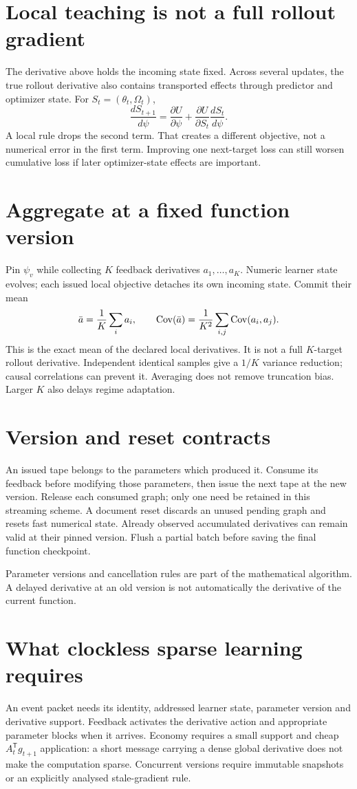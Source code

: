 \documentclass[11pt]{article}
\begin{document}
\section{Local teaching is not a full rollout gradient}
The derivative above holds the incoming state fixed. Across several updates, the true rollout derivative also contains transported effects through predictor and optimizer state. For $S_t=(\theta_t,\Omega_t)$,
\[
 \frac{dS_{t+1}}{d\psi}=\frac{\partial U}{\partial\psi}
       +\frac{\partial U}{\partial S_t}\frac{dS_t}{d\psi}.
\]
A local rule drops the second term. That creates a different objective, not a numerical error in the first term. Improving one next-target loss can still worsen cumulative loss if later optimizer-state effects are important.
\section{Aggregate at a fixed function version}
Pin $\psi_v$ while collecting $K$ feedback derivatives $a_1,\ldots,a_K$. Numeric learner state evolves; each issued local objective detaches its own incoming state. Commit their mean
\[
 \bar a=\frac1K\sum_i a_i,\qquad
 \operatorname{Cov}(\bar a)=\frac1{K^2}\sum_{i,j}\operatorname{Cov}(a_i,a_j).
\]
This is the exact mean of the declared local derivatives. It is not a full $K$-target rollout derivative. Independent identical samples give a $1/K$ variance reduction; causal correlations can prevent it. Averaging does not remove truncation bias. Larger $K$ also delays regime adaptation.
\section{Version and reset contracts}
An issued tape belongs to the parameters which produced it. Consume its feedback before modifying those parameters, then issue the next tape at the new version. Release each consumed graph; only one need be retained in this streaming scheme. A document reset discards an unused pending graph and resets fast numerical state. Already observed accumulated derivatives can remain valid at their pinned version. Flush a partial batch before saving the final function checkpoint.
\begin{keyidea}
Parameter versions and cancellation rules are part of the mathematical algorithm. A delayed derivative at an old version is not automatically the derivative of the current function.
\end{keyidea}
\newpage
\section{What clockless sparse learning requires}
An event packet needs its identity, addressed learner state, parameter version and derivative support. Feedback activates the derivative action and appropriate parameter blocks when it arrives. Economy requires a small support and cheap $A_t^{\mathsf T}g_{t+1}$ application: a short message carrying a dense global derivative does not make the computation sparse. Concurrent versions require immutable snapshots or an explicitly analysed stale-gradient rule.
\end{document}
